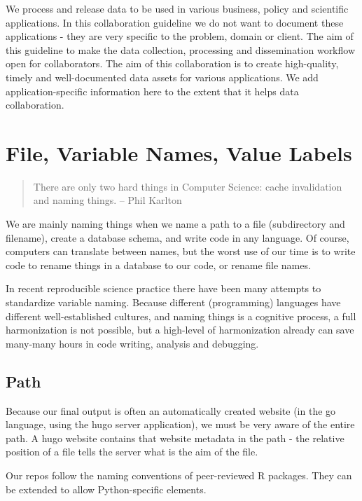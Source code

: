 \documentclass[
  fontsize=13pt,
  english,
  a4paper,
  openany, a4paper, oneside]{book}
\begin{document}
We process and release data to be used in various business, policy and scientific applications. In this collaboration guideline we do not want to document these applications - they are very specific to the problem, domain or client. The aim of this guideline to make the data collection, processing and dissemination workflow open for collaborators. The aim of this collaboration is to create high-quality, timely and well-documented data assets for various applications. We add application-specific information here to the extent that it helps data collaboration.

\hypertarget{naming-conventions}{%
\section{File, Variable Names, Value Labels}\label{naming-conventions}}

\begin{quote}
There are only two hard things in Computer Science: cache invalidation and naming things. -- Phil Karlton
\end{quote}

We are mainly naming things when we name a path to a file (subdirectory and filename), create a database schema, and write code in any language. Of course, computers can translate between names, but the worst use of our time is to write code to rename things in a database to our code, or rename file names.

In recent reproducible science practice there have been many attempts to standardize variable naming. Because different (programming) languages have different well-established cultures, and naming things is a cognitive process, a full harmonization is not possible, but a high-level of harmonization already can save many-many hours in code writing, analysis and debugging.

\hypertarget{path}{%
\subsection{Path}\label{path}}

Because our final output is often an automatically created website (in the go language, using the hugo server application), we must be very aware of the entire path. A hugo website contains that website metadata in the path - the relative position of a file tells the server what is the aim of the file.

Our repos follow the naming conventions of peer-reviewed R packages. They can be extended to allow Python-specific elements.
\end{document}
